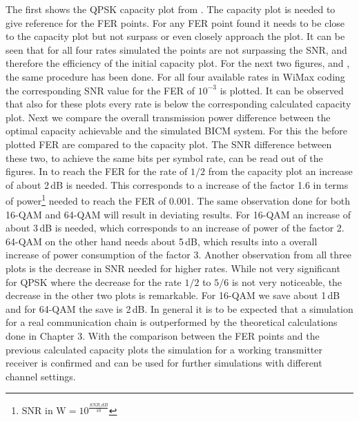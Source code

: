 \newpage
The first  shows the QPSK capacity plot from . The capacity plot is needed to give reference for the \gls{FER} points. For any \gls{FER} point found it needs to be close to the capacity plot but not surpass or even closely approach the plot. It can be seen that for all four rates simulated the points are not surpassing the \gls{SNR}, and therefore the efficiency of the initial  capacity plot.
For the next two figures,  and , the same procedure has been done. For all four available rates in WiMax coding the corresponding SNR value for the \gls{FER} of $10^{-3}$ is plotted. It can be observed that also for these plots every rate is below the corresponding calculated capacity plot. 
\newline
Next we compare the overall transmission power difference between the optimal capacity achievable and the simulated BICM system. For this the before plotted \gls{FER} are compared to the capacity plot. The \gls{SNR} difference between these two, to achieve the same bits per symbol rate, can be read out of the figures. 
In  to reach the \gls{FER} for the rate of $1/2$ from the capacity plot an increase of about 2\,dB is needed. This corresponds to a increase of the factor 1.6 in terms of power\footnote{$\textrm{SNR in W} = 10^{\frac{SNR\_dB}{10}}$} needed to reach the \gls{FER} of 0.001. The same observation done for both 16-QAM and 64-QAM will result in deviating results. For 16-QAM an increase of about 3\,dB is needed, which corresponds to an increase of power of the factor 2. 64-QAM on the other hand needs about 5\,dB, which results into a overall increase of power consumption of the factor 3.
\newline
Another observation from all three plots is the decrease in \gls{SNR} needed for higher rates. While not very significant for \gls{QPSK} where the decrease for the rate $1/2$ to $5/6$ is not very noticeable, the decrease in the other two plots is remarkable. For 16-QAM we save about 1\,dB and for 64-QAM the save is 2\,dB.
In general it is to be expected that a simulation for a real communication chain is outperformed by the theoretical calculations done in Chapter 3. With the comparison between the \gls{FER} points and the previous calculated capacity plots the simulation for a working transmitter receiver is confirmed and can be used for further simulations with different channel settings.




